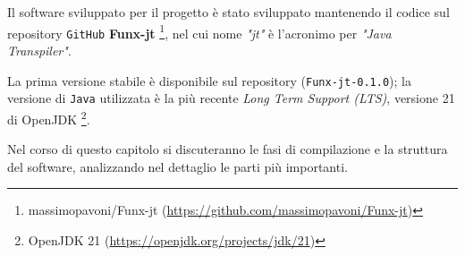 \chapter{}
\label{chap:5-compiler}

Il software sviluppato per il progetto è stato sviluppato mantenendo il codice sul repository \texttt{GitHub} \textbf{Funx-jt}%
\footnote{massimopavoni/Funx-jt (\url{https://github.com/massimopavoni/Funx-jt})},
nel cui nome \textit{"jt"} è l'acronimo per \textit{"Java Transpiler"}.

\noindent La prima versione stabile è disponibile sul repository (\texttt{Funx-jt-0.1.0});
la versione di \texttt{Java} utilizzata è la più recente \textit{Long Term Support (LTS)},
versione 21 di OpenJDK%
\footnote{OpenJDK 21 (\url{https://openjdk.org/projects/jdk/21})}.

Nel corso di questo capitolo si discuteranno le fasi di compilazione e la struttura del software,
analizzando nel dettaglio le parti più importanti.







